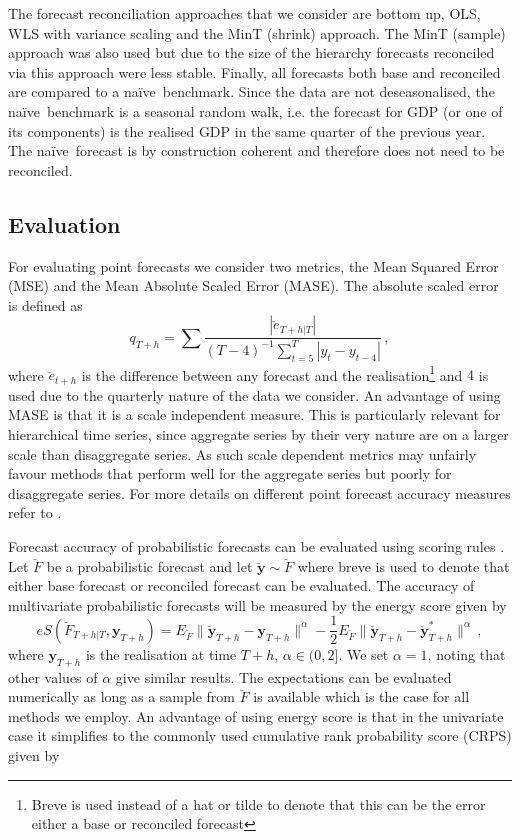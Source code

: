 \documentclass[graybox]{svmult}
\def\naive{na\"{i}ve\ }
\begin{document}
The forecast reconciliation approaches that we consider are bottom up, OLS, WLS with variance scaling and the MinT (shrink) approach.  The MinT (sample) approach was also used but due to the size of the hierarchy forecasts reconciled via this approach were less stable.  Finally, all forecasts both base and reconciled are compared to a \naive benchmark.  Since the data are not deseasonalised, the \naive benchmark is a seasonal random walk, i.e. the forecast for GDP (or one of its components) is the realised GDP in the same quarter of the previous year.  The \naive forecast is by construction coherent and therefore does not need to be reconciled.

\subsection{Evaluation}

For evaluating point forecasts we consider two metrics, the Mean Squared Error (MSE) and the Mean Absolute Scaled Error (MASE).  The absolute scaled error is defined as
\begin{equation*}
q_{T+h} = \sum \frac{|\breve{e}_{T+h|T}|}{(T-4)^{-1}\sum_{t=5}^{T}|y_t - y_{t-4}|}\,,
\end{equation*}
where $\breve{e}_{t+h}$ is the difference between any forecast and the realisation\footnote{Breve is used instead of a hat or tilde to denote that this can be the error either a base or reconciled forecast} and $4$ is used due to the quarterly nature of the data we consider.  An advantage of using MASE is that it is a scale independent measure. This is particularly relevant for hierarchical time series, since aggregate series by their very nature are on a larger scale than disaggregate series.  As such scale dependent metrics may unfairly favour methods that perform well for the aggregate series but poorly for disaggregate series.  For more details on different point forecast accuracy measures refer to \cite[Chapter 3 of][]{HynAth2018}.

Forecast accuracy of probabilistic forecasts can be evaluated using scoring rules \citep{Gneiting2014}.  Let $\breve{F}$ be a probabilistic forecast and let $\breve{\bm{y}}\sim \breve{F}$  where breve is used to denote that either base forecast or reconciled forecast can be evaluated.  The accuracy of multivariate probabilistic forecasts will be measured by the energy score given by
\begin{equation*}
eS(\breve{F}_{T+h|T},\bm{y}_{T+h}) =
E_{\breve{F}}\|\breve{\bm{y}}_{T+h}-\bm{y}_{T+h}\|^\alpha
-\frac{1}{2}E_{\breve{F}}\|\breve{\bm{y}}_{T+h}-\breve{\bm{y}}^*_{T+h}\|^\alpha\,,
\end{equation*} where $\bm{y}_{T+h}$ is the realisation at time $T+h$, $\alpha\in (0,2]$. We set $\alpha=1$, noting that other values of $\alpha$ give similar results.  The expectations can be evaluated numerically as long as a sample from $\breve{F}$ is available which is the case for all methods we employ.  An advantage of using energy score is that in the univariate case it simplifies to the commonly used cumulative rank probability score (CRPS) given by
\end{document}
